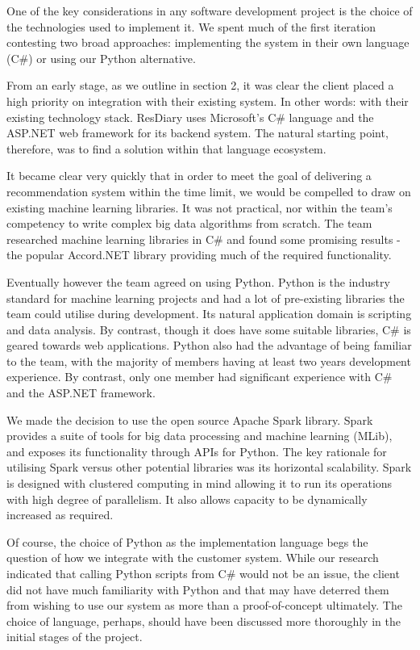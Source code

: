 \documentclass{l3proj}
\begin{document}
One of the key considerations in any software development project is the choice of the technologies used to implement it. We spent much of the first iteration contesting two broad approaches: implementing the system in their own language (C\#) or using our Python alternative.

From an early stage, as we outline in section 2, it was clear the client placed a high priority on integration with their existing system. In other words: with their existing technology stack. ResDiary uses Microsoft's C\# language and the ASP.NET web framework for its backend system. The natural starting point, therefore, was to find a solution within that language ecosystem. 

It became clear very quickly that in order to meet the goal of delivering a recommendation system within the time limit, we would be compelled to draw on existing machine learning libraries. It was not practical, nor within the team’s competency to write complex big data algorithms from scratch. The team researched machine learning libraries in C\# and found some promising results - the popular Accord.NET library providing much of the required functionality. 

Eventually however the team agreed on using Python. Python is the industry standard for machine learning projects and had a lot of pre-existing libraries the team could utilise during development. Its natural application domain is scripting and data analysis. By contrast, though it does have some suitable libraries, C\# is geared towards web applications. Python also had the advantage of being familiar to the team, with the majority of members having at least two years development experience. By contrast, only one member had significant experience with C\# and the ASP.NET framework.

We made the decision to use the open source Apache Spark library. Spark provides a suite of tools for big data processing and machine learning (MLib), and exposes its functionality through APIs for Python. The key rationale for utilising Spark versus other potential libraries was its horizontal scalability. Spark is designed with clustered computing in mind allowing it to run its operations with high degree of parallelism. It also allows capacity to be dynamically increased as required. 

Of course, the choice of Python as the implementation language begs the question of how we integrate with the customer system. While our research indicated that calling Python scripts from C\# would not be an issue, the client did not have much familiarity with Python and that may have deterred them from wishing to use our system as more than a proof-of-concept ultimately. The choice of language, perhaps, should have been discussed more thoroughly in the initial stages of the project.
\end{document}
